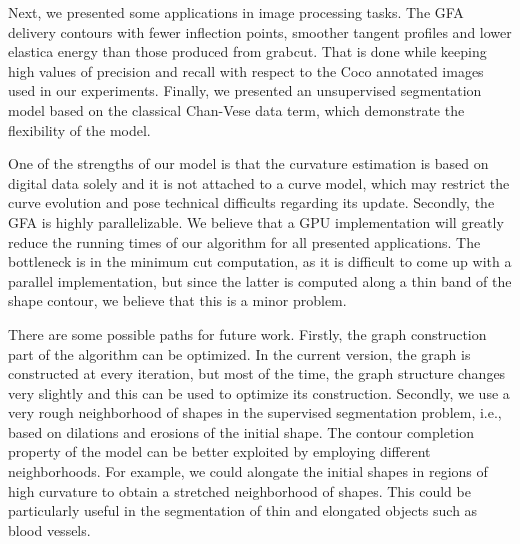 \documentclass[review]{siamart220329}
\begin{document}
Next, we presented some applications in image processing tasks. The GFA delivery contours with fewer inflection points, smoother tangent profiles and lower elastica energy than those produced from grabcut. That is done while keeping high values of precision and recall with respect to the Coco annotated images used in our experiments. Finally, we presented an unsupervised segmentation model based on the classical Chan-Vese data term, which demonstrate the flexibility of the model. 

One of the strengths of our model is that the curvature estimation is based on digital data solely and it is not attached to a curve model, which may restrict the curve evolution and pose technical difficults regarding its update. Secondly, the GFA is highly parallelizable. We believe that a GPU implementation will greatly reduce the running times of our algorithm for all presented applications. The bottleneck is in the minimum cut computation, as it is difficult to come up with a parallel implementation, but since the latter is computed along a thin band of the shape contour, we believe that this is a minor problem.

There are some possible paths for future work. Firstly, the graph construction part of the algorithm can be optimized. In the current version, the graph is constructed at every iteration, but most of the time, the graph structure changes very slightly and this can be used to optimize its construction. Secondly, we use a very rough neighborhood of shapes in the supervised segmentation problem, i.e., based on dilations and erosions of the initial shape. The contour completion property of the model can be better exploited by employing different neighborhoods. For example, we could alongate the initial shapes in regions of high curvature to obtain a stretched neighborhood of shapes. This could be particularly useful in the segmentation of thin and elongated objects such as blood vessels.
%
%
%
%


\end{document}
